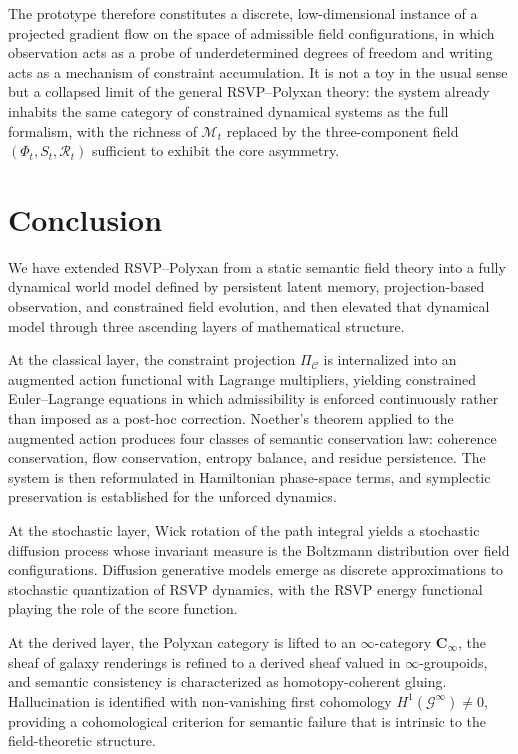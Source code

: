 \documentclass[11pt]{article}
\begin{document}
The prototype therefore constitutes a discrete, low-dimensional instance
of a projected gradient flow on the space of admissible field
configurations, in which observation acts as a probe of underdetermined
degrees of freedom and writing acts as a mechanism of constraint
accumulation.
It is not a toy in the usual sense but a collapsed limit of the general
RSVP--Polyxan theory: the system already inhabits the same category of
constrained dynamical systems as the full formalism, with the richness of
$\mathcal{M}_t$ replaced by the three-component field $({\Phi}_t, S_t,
\mathcal{R}_t)$ sufficient to exhibit the core asymmetry.

\section{Conclusion}

We have extended RSVP--Polyxan from a static semantic field theory into a
fully dynamical world model defined by persistent latent memory,
projection-based observation, and constrained field evolution, and then
elevated that dynamical model through three ascending layers of mathematical
structure.

At the classical layer, the constraint projection $\Pi_{\mathcal{C}}$ is
internalized into an augmented action functional with Lagrange multipliers,
yielding constrained Euler--Lagrange equations in which admissibility is
enforced continuously rather than imposed as a post-hoc correction.
Noether's theorem applied to the augmented action produces four classes of
semantic conservation law: coherence conservation, flow conservation,
entropy balance, and residue persistence.
The system is then reformulated in Hamiltonian phase-space terms, and
symplectic preservation is established for the unforced dynamics.

At the stochastic layer, Wick rotation of the path integral yields a
stochastic diffusion process whose invariant measure is the Boltzmann
distribution over field configurations.
Diffusion generative models emerge as discrete approximations to stochastic
quantization of RSVP dynamics, with the RSVP energy functional playing the
role of the score function.

At the derived layer, the Polyxan category is lifted to an $\infty$-category
$\mathbf{C}_\infty$, the sheaf of galaxy renderings is refined to a derived
sheaf valued in $\infty$-groupoids, and semantic consistency is characterized
as homotopy-coherent gluing.
Hallucination is identified with non-vanishing first cohomology
$H^1(\mathscr{G}^\infty) \neq 0$, providing a cohomological criterion for
semantic failure that is intrinsic to the field-theoretic structure.
\end{document}
